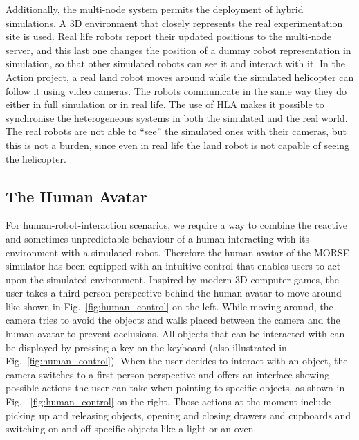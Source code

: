 \documentclass{llncs}
\begin{document}
Additionally, the multi-node system permits the deployment of hybrid
simulations. A 3D environment that closely represents the real experimentation
site is used. Real life robots report their updated positions to the multi-node
server, and this last one changes the position of a dummy robot representation
in simulation, so that other simulated robots can see it and interact with it.
In the Action project, a real land robot moves around while the simulated
helicopter can follow it using video cameras.
The robots communicate in the same way they do either in full simulation or in
real life. The use of HLA makes it possible to synchronise the heterogeneous
systems in both the simulated and the real world.
The real robots are not able to ``see'' the simulated ones with their
cameras, but this is not a burden, since even in real life the land
robot is not capable of seeing the helicopter.

\subsection{The Human Avatar}
\label{section:human}

For human-robot-interaction scenarios, we require a way to combine the
reactive and sometimes unpredictable behaviour of a human interacting with its
environment with a simulated robot. Therefore the human avatar of the MORSE
simulator has been equipped with an intuitive control that enables users to act
upon the simulated environment. Inspired by modern 3D-computer games, the user
takes a third-person perspective behind the human avatar to move around like
shown in Fig.~\ref{fig:human_control} on the left.
While moving around, the camera tries to avoid the objects and walls placed
between the camera and the human avatar to prevent occlusions.  All objects
that can be interacted with can be displayed by pressing a key on the
keyboard (also illustrated in Fig.~\ref{fig:human_control}). When the user
decides to interact with an object, the camera switches to a first-person
perspective and offers an interface showing possible actions the
user can take when pointing to specific objects, as shown in Fig.~
\ref{fig:human_control} on the right. Those actions at the moment include
picking up and releasing objects, opening and closing drawers and cupboards and
switching on and off specific objects like a light or an oven.
\end{document}
